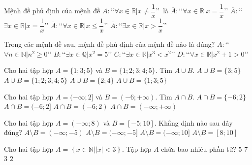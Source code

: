 \begin{ex}%
	Mệnh đề phủ định của mệnh đề $A\colon$\lq\lq  $\forall x\in\mathbb{R}| x\ne \dfrac{1}{x}$\rq\rq\, là
	\choice
	{$\overline{A}\colon$\lq\lq  $\forall x\in\mathbb{R}| x= \dfrac{1}{x}$\rq\rq}
	{\True $\overline{A}\colon$\lq\lq  $\exists x\in\mathbb{R}| x= \dfrac{1}{x}$\rq\rq}
	{$\overline{A}\colon$\lq\lq  $\forall x\in\mathbb{R}| x\le \dfrac{1}{x}$\rq\rq}
	{$\overline{A}\colon$\lq\lq  $\exists x\in\mathbb{R}| x> \dfrac{1}{x}$\rq\rq}
\end{ex}
\begin{ex}%
	Trong các mệnh đề sau, mệnh đề phủ định của mệnh đề nào là đúng?
	\choice
	{$A\colon$\lq\lq  $\forall n\in\mathbb{N}| n^2\ge 0$\rq\rq}
	{\True $B\colon$\lq\lq  $\exists x\in\mathbb{Q}| x^2=5$\rq\rq}
	{$C\colon$\lq\lq  $\exists x\in\mathbb{R}| x^3<x^2$\rq\rq}
	{$D\colon$\lq\lq  $\forall x\in\mathbb{R}| x^2+1>0$\rq\rq}
\end{ex}
\begin{ex}%
	Cho hai tập hợp $A=\{1;3;5\}$ và $B=\{1;2;3;4;5\}$. Tìm $A\cup B$.
	\choice
	{$A\cup B=\{3;5\}$}
	{\True $A\cup B=\{1;2;3;4;5\}$}
	{$A\cup B=\{2;4\}$}
	{$A\cup B=\{1;3;5\}$}
\end{ex}
\begin{ex}%
	Cho hai tập hợp $A=(-\infty;2]$ và $B=(-6;+\infty)$. Tìm $A\cap B$.
	\choice
	{$A\cap B=\{-6;2\}$}
	{\True $A\cap B=(-6;2]$}
	{$A\cap B=(-6;2)$}
	{$A\cap B=(-\infty;+\infty)$}
	\loigiai{
		Ta có $A\cap B=(-6;2]$.
	}
\end{ex}
\begin{ex}%
	Cho hai tập hợp $A=(-\infty;8)$ và $B=[-5;10]$. Khẳng định nào sau đây đúng?
	\choice
	{\True $A\setminus B=(-\infty;-5)$}
	{$A\setminus B=(-\infty;-5]$}
	{$A\setminus B=(-\infty;10]$}
	{$A\setminus B=[8;10]$}
\end{ex}
\begin{ex}%
	Cho hai tập hợp $A=\left\{x\in\mathbb{N}| |x|<3\right\}$. Tập hợp $A$ chứa bao nhiêu phần tử?
	\choice
	{$5$}
	{$7$}
	{\True $3$}
	{$2$}
\end{ex}
